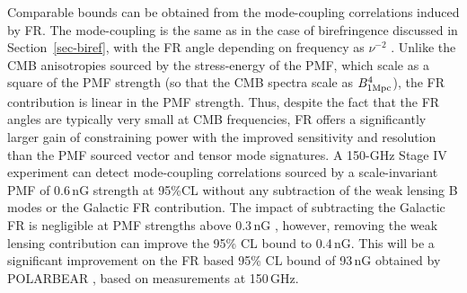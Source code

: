 Comparable bounds can be obtained from the mode-coupling correlations induced by FR. The mode-coupling is the same as in the case of birefringence discussed in Section~\ref{sec-biref}, with the FR angle depending on frequency as $\nu^{-2}$ \cite{Yadav:2012uz,De:2013dra,Pogosian:2013dya}. Unlike the CMB anisotropies sourced by the stress-energy of the PMF, which scale as a square of the PMF strength (so that the CMB spectra scale as $B^4_{1 {\rm Mpc}}$), the FR contribution is linear in the PMF strength. Thus, despite the fact that the FR angles are typically very small at CMB frequencies, FR offers a significantly larger gain of constraining power with the improved sensitivity and resolution \cite{Pogosian:2013dya} than the PMF sourced vector and tensor mode signatures. A 150-GHz Stage IV experiment can detect mode-coupling correlations sourced by a scale-invariant PMF of 0.6\,nG strength at 95\%CL without any subtraction of the weak lensing B modes or the Galactic FR contribution. The impact of subtracting the Galactic FR is negligible at PMF strengths above 0.3\,nG \cite{De:2013dra}, however, removing the weak lensing contribution can improve the 95\% CL bound to 0.4\,nG. This will be a significant improvement on the FR based 95\% CL bound of 93\,nG obtained by POLARBEAR  \cite{Ade:2015cao}, based on measurements at 150\,GHz.

